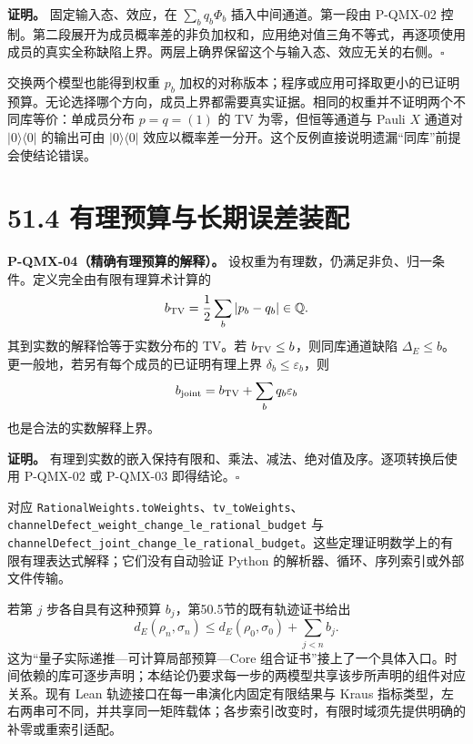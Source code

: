 \documentclass[
  11pt,
  oneside]{book}
\begin{document}
\textbf{证明。} 固定输入态、效应，在 \(\sum_b q_b\Phi_b\)
插入中间通道。第一段由 P-QMX-02
控制。第二段展开为成员概率差的非负加权和，应用绝对值三角不等式，再逐项使用成员的真实全称缺陷上界。两层上确界保留这个与输入态、效应无关的右侧。\(\square\)

交换两个模型也能得到权重 \(p_b\)
加权的对称版本；程序或应用可择取更小的已证明预算。无论选择哪个方向，成员上界都需要真实证据。相同的权重并不证明两个不同库等价：单成员分布
\(p=q=(1)\) 的 TV 为零，但恒等通道与 Pauli \(X\) 通道对
\(|0\rangle\langle0|\) 的输出可由 \(|0\rangle\langle0|\)
效应以概率差一分开。这个反例直接说明遗漏``同库''前提会使结论错误。

\hypertarget{ux6709ux7406ux9884ux7b97ux4e0eux957fux671fux8befux5deeux88c5ux914d}{%
\section{51.4
有理预算与长期误差装配}\label{ux6709ux7406ux9884ux7b97ux4e0eux957fux671fux8befux5deeux88c5ux914d}}

\protect\hypertarget{p-qmx-04}{}{}

\textbf{P-QMX-04（精确有理预算的解释）。}
设权重为有理数，仍满足非负、归一条件。定义完全由有限有理算术计算的 \[
b_{\rm TV}=\frac12\sum_b|p_b-q_b|\in\mathbb Q.
\] 其到实数的解释恰等于实数分布的 TV。若
\(b_{\rm TV}\le b\)，则同库通道缺陷
\(\Delta_E\le b\)。更一般地，若另有每个成员的已证明有理上界
\(\delta_b\le\varepsilon_b\)，则 \[
b_{\rm joint}=b_{\rm TV}+\sum_b q_b\varepsilon_b
\] 也是合法的实数解释上界。

\textbf{证明。}
有理到实数的嵌入保持有限和、乘法、减法、绝对值及序。逐项转换后使用
P-QMX-02 或 P-QMX-03 即得结论。\(\square\)

对应
\texttt{RationalWeights.toWeights}、\allowbreak \texttt{tv\_\allowbreak toWeights}、\allowbreak \texttt{channelDefect\_\allowbreak weight\_\allowbreak change\_\allowbreak le\_\allowbreak rational\_\allowbreak budget}
与
\texttt{channelDefect\_\allowbreak joint\_\allowbreak change\_\allowbreak le\_\allowbreak rational\_\allowbreak budget}。这些定理证明数学上的有限有理表达式解释；它们没有自动验证
Python 的解析器、循环、序列索引或外部文件传输。

若第 \(j\) 步各自具有这种预算 \(b_j\)，第50.5节的既有轨迹证书给出 \[
d_E(\rho_n,\sigma_n)\le d_E(\rho_0,\sigma_0)+\sum_{j<n}b_j.
\] 这为``量子实际递推---可计算局部预算---Core
组合证书''接上了一个具体入口。时间依赖的库可逐步声明；本结论仍要求每一步的两模型共享该步所声明的组件对应关系。现有
Lean 轨迹接口在每一串演化内固定有限结果与 Kraus
指标类型，左右两串可不同，并共享同一矩阵载体；各步索引改变时，有限时域须先提供明确的补零或重索引适配。
\end{document}
